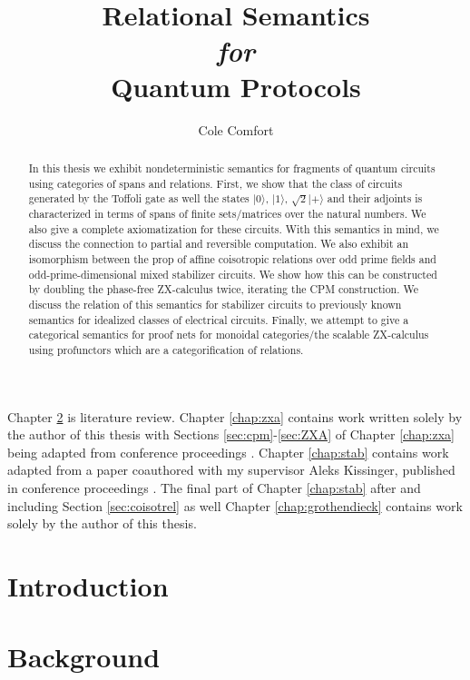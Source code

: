 \documentclass[12pt]{ociamthesis}  %
\title{Relational Semantics \\{ \it \Large for}\\ Quantum Protocols}
\author{Cole Comfort}
\begin{document}
\maketitle


\begin{abstract}
In this thesis we exhibit nondeterministic semantics for fragments of quantum circuits using  categories of spans and relations.  First, we show that the class of circuits generated by the  Toffoli gate as well the states $|0\rangle$, $|1\rangle$, $\sqrt{2}|+\rangle$ and their adjoints is characterized in terms of spans of finite sets/matrices over the natural numbers.  We also give a complete axiomatization for these circuits.  With this semantics in mind, we discuss the connection to partial and reversible computation. We also exhibit an isomorphism between the prop of affine coisotropic relations over odd prime fields and odd-prime-dimensional mixed stabilizer circuits.  We show how this can be constructed by doubling the phase-free ZX-calculus twice, iterating the CPM construction.  We discuss the relation of this semantics for stabilizer circuits to  previously known semantics for idealized classes of electrical circuits.     Finally, we attempt to give a categorical semantics for proof nets for monoidal categories/the scalable ZX-calculus using profunctors which are a categorification of relations.
\end{abstract}

\begin{originality}
Chapter \ref{chap:background} is  literature review.  Chapter \ref{chap:zxa} contains work written solely by the author of this thesis with Sections \ref{sec:cpm}-\ref{sec:ZXA} of Chapter \ref{chap:zxa} being adapted from conference proceedings \cite{zxa}.  Chapter \ref{chap:stab} contains work adapted from a paper coauthored with my supervisor Aleks Kissinger, published in conference proceedings \cite{lagrel}.  The final part of Chapter  \ref{chap:stab} after and including Section \ref{sec:coisotrel} as well Chapter \ref{chap:grothendieck} contains work solely by the author of this thesis.
\end{originality}

\tableofcontents

\chapter{Introduction}
\label{chap:intro}


\chapter{Background}
\label{chap:background}





\end{document}
